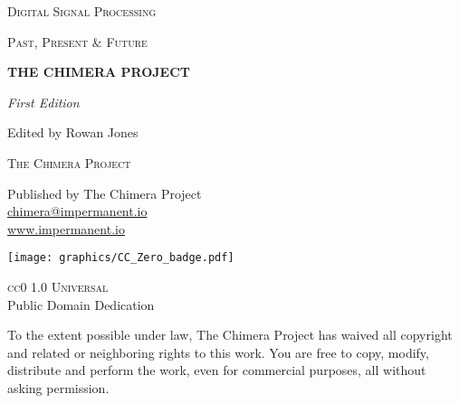 \newpage
\thispagestyle{empty}
\vspace*{4cm}
\begin{center}

{\fontsize{11}{13}\selectfont\textsc{Digital Signal Processing}}

\vspace{0.3cm}

{\fontsize{11}{13}\selectfont\textsc{Past, Present \& Future}}

\vspace{3cm}

{\fontsize{32}{38}\selectfont\bfseries THE CHIMERA PROJECT}

\vspace*{\fill}

{\Large\textit{First Edition}}

\vspace{1cm}

{\large Edited by Rowan Jones}

\vspace{2cm}

\end{center}
\newpage

\newpage
\thispagestyle{empty}
\vspace*{\fill}
\begin{center}

{\large\textsc{The Chimera Project}}

\vspace{1.5cm}

Published by The Chimera Project\\
\href{mailto:chimera@impermanent.io}{chimera@impermanent.io}\\
\url{www.impermanent.io}

\vspace{2cm}

\texttt{[image: graphics/CC\_Zero\_badge.pdf]}

\vspace{0.8cm}

{\large\textsc{cc0 1.0 Universal}}\\
\vspace{0.3cm}
{\normalsize Public Domain Dedication}

\vspace{1.5cm}

\begin{minipage}{0.75\textwidth}
\centering
{\small To the extent possible under law, The Chimera Project has waived all copyright and related or neighboring rights to this work. You are free to copy, modify, distribute and perform the work, even for commercial purposes, all without asking permission.}
\end{minipage}

\end{center}
\vspace*{\fill}
\newpage
